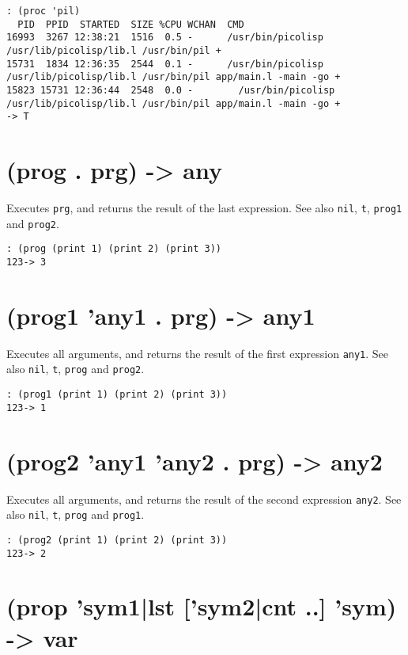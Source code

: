 {{{{{{{\begin{verbatim}
: (proc 'pil)
  PID  PPID  STARTED  SIZE %CPU WCHAN  CMD
16993  3267 12:38:21  1516  0.5 -      /usr/bin/picolisp /usr/lib/picolisp/lib.l /usr/bin/pil +
15731  1834 12:36:35  2544  0.1 -      /usr/bin/picolisp /usr/lib/picolisp/lib.l /usr/bin/pil app/main.l -main -go +
15823 15731 12:36:44  2548  0.0 -        /usr/bin/picolisp /usr/lib/picolisp/lib.l /usr/bin/pil app/main.l -main -go +
-> T
\end{verbatim}

 
\section{(prog . prg) -> any}
\label{sec-8-1-16-36}


Executes \texttt{prg}, and returns the result of the last expression. See also
\texttt{nil}, \texttt{t}, \texttt{prog1} and \texttt{prog2}.


\begin{verbatim}
: (prog (print 1) (print 2) (print 3))
123-> 3
\end{verbatim}

 
\section{(prog1 'any1 . prg) -> any1}
\label{sec-8-1-16-37}


Executes all arguments, and returns the result of the first expression
\texttt{any1}. See also \texttt{nil}, \texttt{t}, \texttt{prog} and \texttt{prog2}.


\begin{verbatim}
: (prog1 (print 1) (print 2) (print 3))
123-> 1
\end{verbatim}

 
\section{(prog2 'any1 'any2 . prg) -> any2}
\label{sec-8-1-16-38}


Executes all arguments, and returns the result of the second expression
\texttt{any2}. See also \texttt{nil}, \texttt{t}, \texttt{prog} and \texttt{prog1}.


\begin{verbatim}
: (prog2 (print 1) (print 2) (print 3))
123-> 2
\end{verbatim}

 
\section{(prop 'sym1|lst ['sym2|cnt ..] 'sym) -> var}
\label{sec-8-1-16-39}


}}}}}}}
